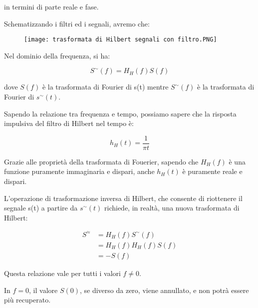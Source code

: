 in termini di parte reale e fase. \newline 

Schematizzando i filtri ed i segnali, avremo che: 

\begin{figure}[h]
    \centering
    \texttt{[image: trasformata di Hilbert segnali con filtro.PNG]}
\end{figure} 

Nel dominio della frequenza, si ha: 

{
    \Large 
    \begin{equation}
        S^{\sim} (f) = H_H (f)S(f)
    \end{equation}
}

dove $S(f)$ è la trasformata di Fourier di s(t) mentre $S^{\sim}(f)$ è la trasformata di Fourier di $s^{\sim} (t)$. \newline 

Sapendo la relazione tra frequenza e tempo, possiamo sapere che la risposta impulsiva del filtro di Hilbert nel tempo è: 

{
    \Large 
    \begin{equation}
        h_H (t) = \frac{1}{\pi t}
    \end{equation}
}

Grazie alle proprietà della trasformata di Fouerier, sapendo che $H_H (f)$ è una funzione puramente immaginaria e dispari, 
anche $h_H (t)$ è puramente reale e dispari. \newline 

L'operazione di trasformazione inversa di Hilbert, che consente di riottenere il segnale s(t) a partire da $s^{\sim} (t)$ richiede, in realtà, una nuova trasformata di Hilbert:

{
    \Large 
    \begin{equation}
        \begin{split}
            S^{\approx} 
            &= 
            H_H(f) S^{\sim} (f) 
            \\ 
            &= 
            H_H(f) H_H(f) S(f) 
            \\ 
            &= 
            -S(f)
        \end{split}
    \end{equation}
}

Questa relazione vale per tutti i valori $f \neq 0$. \newline 

In $f=0$, il valore $S(0)$, se diverso da zero, viene annullato, e non potrà essere più recuperato. \newline 

